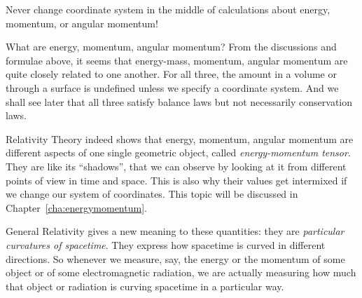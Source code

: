 \documentclass[a4paper,12pt,%
onecolumn,oneside,%
british%
]{memoir}
\newcommand{\mynotew}[1]{{\footnotesize\color{midgrey}\faIcon{tools}\ #1}}
\renewcommand*{\|}[1][]{\nonscript\:#1\vert\nonscript\:\mathopen{}}
\newcommand*{\sect}{\S}%
\newcommand*{\chap}{Chapter}%
\newcommand*{\energym}{energy-mass}
\begin{document}
\begin{warning}
  Never change coordinate system in the middle of calculations about energy, momentum, or angular momentum!
\end{warning}



\bigskip

\begin{extra}{{What are energy, momentum, angular momentum?}}
From the discussions and formulae above, it seems that \energym, momentum, angular momentum are quite closely related to one another. For all three, the amount in a volume or through a surface is undefined unless we specify a coordinate system. And we shall see later that all three satisfy balance laws but not necessarily conservation laws.

  Relativity Theory indeed shows that energy, momentum, angular momentum are different aspects of one single geometric object, called \emph{energy-momentum tensor}. They are like its \enquote{shadows}, that we can observe by looking at it from different points of view in time and space. This is also why their values get intermixed if we change our system of coordinates. This topic will be discussed in \chap~\ref{cha:energymomentum}.

  General Relativity gives a new meaning to these quantities: they are \emph{particular curvatures of spacetime}. They express how spacetime is curved in different directions. So whenever we measure, say, the energy or the momentum of some object or of some electromagnetic radiation, we are actually measuring how much that object or radiation is curving spacetime in a particular way. %
\end{extra}
%
\end{document}
